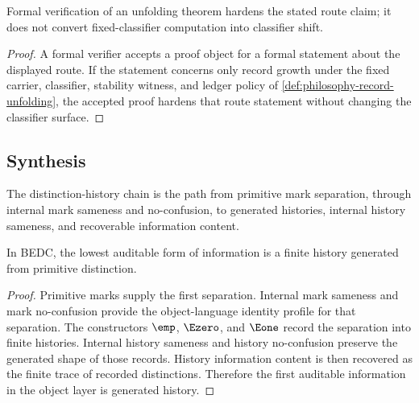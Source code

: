\begin{corollary}
\label{cor:philosophy-verified-unfolding-remains-unfolding-fact}
Formal verification of an unfolding theorem hardens the stated route
claim; it does not convert fixed-classifier computation into classifier
shift.
\end{corollary}
\begin{proof}
A formal verifier accepts a proof object for a formal statement about
the displayed route. If the statement concerns only record growth under
the fixed carrier, classifier, stability witness, and ledger policy of
\autoref{def:philosophy-record-unfolding}, the accepted proof hardens
that route statement without changing the classifier surface.
\end{proof}

\subsection{Synthesis}
\label{subsec:distinction-history-synthesis}

\begin{definition}
\label{def:philosophy-distinction-history-chain}
The distinction-history chain is the path from primitive mark
separation, through internal mark sameness and no-confusion, to
generated histories, internal history sameness, and recoverable
information content.
\end{definition}

\begin{theorem}
\label{thm:philosophy-distinction-generates-history-carries-information}
In BEDC, the lowest auditable form of information is a finite history
generated from primitive distinction.
\end{theorem}
\begin{proof}
Primitive marks supply the first separation. Internal mark sameness and
mark no-confusion provide the object-language identity profile for that
separation. The constructors \(\emp\), \(\Ezero\), and \(\Eone\) record
the separation into finite histories. Internal history sameness and
history no-confusion preserve the generated shape of those records.
History information content is then recovered as the finite trace of
recorded distinctions. Therefore the first auditable information in the
object layer is generated history.
\end{proof}

